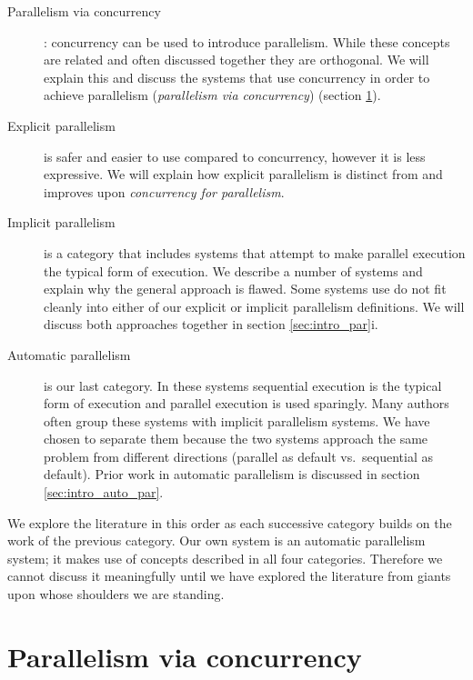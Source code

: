 \begin{description}
    \item[Parallelism via concurrency]:
    concurrency can be used to introduce parallelism.
    While these concepts are related and often discussed together they are
    orthogonal.
    We will explain this and discuss the systems that use concurrency in
    order to achieve parallelism (\emph{parallelism via concurrency})
    (section \ref{sec:intro_concurrency}).

    \item[Explicit parallelism] is safer and easier to use compared to
    concurrency, however it is less expressive.
    We will explain how explicit parallelism is distinct from and improves
    upon \emph{concurrency for parallelism}.

    \item[Implicit parallelism] is a category that includes
    systems that attempt to make parallel execution the typical form of
    execution.
    We describe a number of systems and explain why the general approach is
    flawed.
    Some systems use do not fit cleanly into either of our explicit
    or implicit parallelism definitions.
    We will discuss both approaches together in section
    \ref{sec:intro_par}i.

    \item[Automatic parallelism] is our last category.
    In these systems sequential execution is the typical form of execution
    and parallel execution is used sparingly.
    Many authors often group these systems with implicit parallelism systems.
    We have chosen to separate them because the two systems
    approach the same problem from different directions
    (parallel as default vs.\ sequential as default).
    Prior work in automatic parallelism is discussed in section
    \ref{sec:intro_auto_par}.
\end{description}

\noindent
We explore the literature in this order as each successive category builds
on the work of the previous category.
Our own system is an automatic parallelism system;
it makes use of concepts described in all four categories.
Therefore
we cannot discuss it meaningfully until we have explored the literature
from giants upon whose shoulders we are standing.


\section{Parallelism via concurrency}
\label{sec:intro_concurrency}

